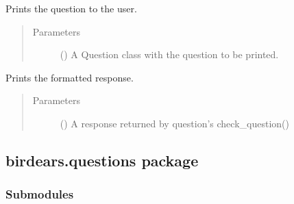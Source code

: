 \documentclass[letterpaper,10pt,english]{sphinxmanual}
\begin{document}

\begin{fulllineitems}
\label{\detokenize{birdears.interfaces:birdears.interfaces.commandline.print_question}}
Prints the question to the user.
\begin{quote}\begin{description}
\item[{Parameters}] \leavevmode
{} () \textendash{} A Question class with the question to be printed.

\end{description}\end{quote}

\end{fulllineitems}


\begin{fulllineitems}
\label{\detokenize{birdears.interfaces:birdears.interfaces.commandline.print_response}}
Prints the formatted response.
\begin{quote}\begin{description}
\item[{Parameters}] \leavevmode
{} () \textendash{} A response returned by question’s check\_question()

\end{description}\end{quote}

\end{fulllineitems}



\subsection{birdears.questions package}
\label{\detokenize{birdears.questions:birdears-questions-package}}\label{\detokenize{birdears.questions::doc}}\label{\detokenize{birdears.questions:module-birdears.questions}}

\subsubsection{Submodules}
\label{\detokenize{birdears.questions:submodules}}
\end{document}
